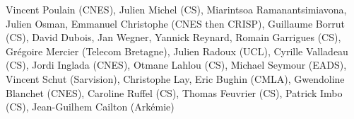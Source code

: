 Vincent Poulain (CNES), Julien Michel (CS), Miarintsoa Ramanantsimiavona, Julien Osman, Emmanuel Christophe (CNES then CRISP), Guillaume Borrut (CS), David Dubois, Jan Wegner, Yannick Reynard, Romain Garrigues (CS), Gr\'egoire Mercier (Telecom Bretagne), Julien Radoux (UCL), Cyrille Valladeau (CS), Jordi Inglada (CNES), Otmane Lahlou (CS), Michael Seymour (EADS), Vincent Schut (Sarvision), Christophe Lay, Eric Bughin (CMLA), Gwendoline Blanchet (CNES), Caroline Ruffel (CS), Thomas Feuvrier (CS), Patrick Imbo (CS), Jean-Guilhem Cailton (Ark\'emie)
